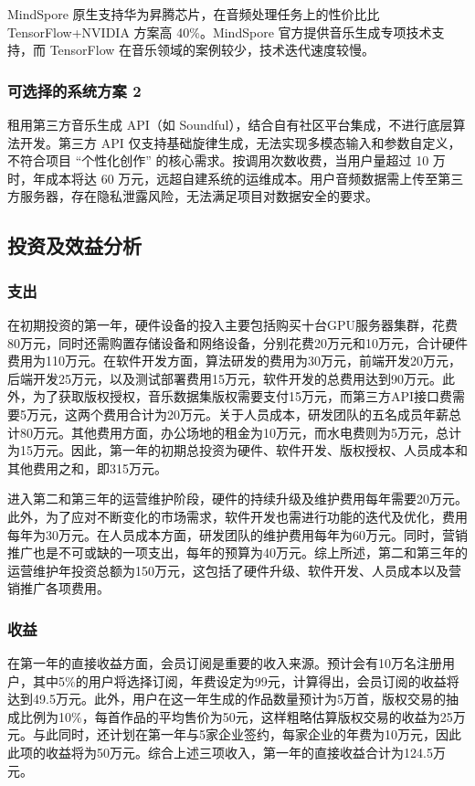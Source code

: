 \documentclass{base}
\numberwithin{figure}{section} %
\begin{document}
MindSpore 原生支持华为昇腾芯片，在音频处理任务上的性价比比 TensorFlow+NVIDIA 方案高 40\%。MindSpore 官方提供音乐生成专项技术支持，而 TensorFlow 在音乐领域的案例较少，技术迭代速度较慢。

\subsubsection{可选择的系统方案 2}

租用第三方音乐生成 API（如 Soundful），结合自有社区平台集成，不进行底层算法开发。第三方 API 仅支持基础旋律生成，无法实现多模态输入和参数自定义，不符合项目 “个性化创作” 的核心需求。按调用次数收费，当用户量超过 10 万时，年成本将达 60 万元，远超自建系统的运维成本。用户音频数据需上传至第三方服务器，存在隐私泄露风险，无法满足项目对数据安全的要求。

\subsection{投资及效益分析}

\subsubsection{支出}

在初期投资的第一年，硬件设备的投入主要包括购买十台GPU服务器集群，花费80万元，同时还需购置存储设备和网络设备，分别花费20万元和10万元，合计硬件费用为110万元。在软件开发方面，算法研发的费用为30万元，前端开发20万元，后端开发25万元，以及测试部署费用15万元，软件开发的总费用达到90万元。此外，为了获取版权授权，音乐数据集版权需要支付15万元，而第三方API接口费需要5万元，这两个费用合计为20万元。关于人员成本，研发团队的五名成员年薪总计80万元。其他费用方面，办公场地的租金为10万元，而水电费则为5万元，总计为15万元。因此，第一年的初期总投资为硬件、软件开发、版权授权、人员成本和其他费用之和，即315万元。

进入第二和第三年的运营维护阶段，硬件的持续升级及维护费用每年需要20万元。此外，为了应对不断变化的市场需求，软件开发也需进行功能的迭代及优化，费用每年为30万元。在人员成本方面，研发团队的维护费用每年为60万元。同时，营销推广也是不可或缺的一项支出，每年的预算为40万元。综上所述，第二和第三年的运营维护年投资总额为150万元，这包括了硬件升级、软件开发、人员成本以及营销推广各项费用。

\subsubsection{收益}
在第一年的直接收益方面，会员订阅是重要的收入来源。预计会有10万名注册用户，其中5\%的用户将选择订阅，年费设定为99元，计算得出，会员订阅的收益将达到49.5万元。此外，用户在这一年生成的作品数量预计为5万首，版权交易的抽成比例为10\%，每首作品的平均售价为50元，这样粗略估算版权交易的收益为25万元。与此同时，还计划在第一年与5家企业签约，每家企业的年费为10万元，因此此项的收益将为50万元。综合上述三项收入，第一年的直接收益合计为124.5万元。
\end{document}
